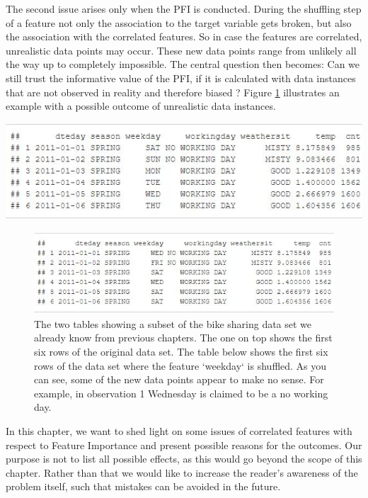 \documentclass[]{krantz}
\begin{document}
The second issue arises only when the PFI is conducted. During the
shuffling step of a feature not only the association to the target
variable gets broken, but also the association with the correlated
features. So in case the features are correlated, unrealistic data
points may occur. These new data points range from unlikely all the way
up to completely impossible. The central question then becomes: Can we
still trust the informative value of the PFI, if it is calculated with
data instances that are not observed in reality and therefore biased
\citep{molnar2019}? Figure \ref{fig:realPFI02} illustrates an example
with a possible outcome of unrealistic data instances.

\begin{center}\includegraphics[width=0.75\linewidth]{images/realPFI01} \end{center}

\begin{figure}

{\centering \includegraphics[width=0.75\linewidth]{images/realPFI02} 

}

\caption{The two tables showing a subset of the bike sharing data set we already know from previous chapters. The one on top shows the first six rows of the original data set. The table below shows the first six rows of the data set where the feature `weekday` is shuffled. As you can see, some of the new data points appear to make no sense. For example, in observation 1 Wednesday is claimed to be a no working day.}\label{fig:realPFI02}
\end{figure}

In this chapter, we want to shed light on some issues of correlated
features with respect to Feature Importance and present possible reasons
for the outcomes. Our purpose is not to list all possible effects, as
this would go beyond the scope of this chapter. Rather than that we
would like to increase the reader's awareness of the problem itself,
such that mistakes can be avoided in the future.
\end{document}
